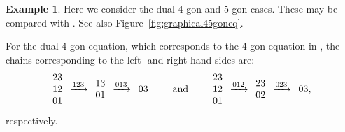 \documentclass[pdftex]{sigma}
\numberwithin{equation}{section}
\theoremstyle{definition}
\newtheorem{Example}[Theorem]{Example}
\begin{document}
\begin{Example}
 Here we consider the dual 4-gon and 5-gon cases. These may be compared with \cite[Section~4.2]{dimakis2015simplex}. See also Figure~\ref{fig:graphical45goneq}.

 For the dual 4-gon equation, which corresponds to the 4-gon equation in \cite{dimakis2015simplex}, the chains corresponding to the left- and right-hand sides are:
 \begin{equation*}
 \begin{array}{@{}c@{\;}c@{\;}c@{\;}c@{\;}c}
 \begin{array}{c}
 23\\
 12\\
 01
 \end{array}
 &
 \xrightarrow{123}
 &
 \begin{array}{c}
 13\\
 01
 \end{array}
 &
 \xrightarrow{013}
 &
 \begin{array}{c@{}}
 03
 \end{array}
 \end{array}
 \qquad\text{and}\qquad
 \begin{array}{@{}c@{\;}c@{\;}c@{\;}c@{\;}c}
 \begin{array}{c}
 23\\
 12\\
 01
 \end{array}
 &
 \xrightarrow{012}
 &
 \begin{array}{c}
 23\\
 02
 \end{array}
 &
 \xrightarrow{023}
 &
 \begin{array}{c@{}}
 03
 \end{array},
 \end{array}
 \end{equation*}
 respectively.


\end{Example}
\end{document}
